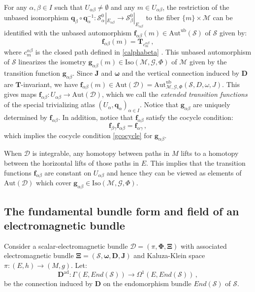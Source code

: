 \documentclass[10pt, cmp, numbook, final, a4paper]{svjour}
\newcommand*{\SavedEqref}{}
\let\SavedEqref\eqref
\renewcommand*{\eqref}[1]{%
  \begingroup
    \hypersetup{
      linkcolor=blue,
      linkbordercolor=blue,
    }%
    \SavedEqref{#1}%
  \endgroup
}
\def\ad{\mathrm{ad}}
\newcommand{\Aut}{\mathrm{Aut}}
\def\bD{\mathbb{D}}
\def\ad{\mathrm{ad}}
\def\bcD{\boldsymbol{\mathcal{D}}}
\def\bJ{\mathbf{J}}
\def\bomega{\boldsymbol{\omega}}
\def\bJ{\mathbf{J}}
\newcommand{\be}{\begin{equation*}}
\newcommand{\ee}{\end{equation*}}
\newcommand{\ben}{\begin{equation}}
\newcommand{\een}{\end{equation}}
\newcommand{\cM}{\mathcal{M}}
\def\cD{\mathcal{D}}
\def\cG{\mathcal{G}}
\def\bXi{{\boldsymbol{\Xi}}}
\def\cS{\mathcal{S}}
\def\mf{\mathbf{f}}
\def\bg{\mathbf{g}}
\def\mT{\mathbf{T}}
\def\bPhi{\mathbf{\Phi}}
\def\bD{\mathbf{D}}
\def\bg{\mathbf{g}}
\def\bomega{\boldsymbol{\omega}}
\def\Iso{\mathrm{Iso}}
\def\ub{\mathrm{ub}}
\def\bcS{\boldsymbol{\mathcal{S}}}
\def\bD{\mathbf{D}}
\def\mq{\mathbf{q}}
\begin{document}
For any $\alpha,\beta\in I$ such that $U_{\alpha\beta}\neq \emptyset$
and any $m\in U_{\alpha\beta}$, the restriction of the unbased
isomorphism $\mq_\beta\circ
\mq^{-1}_\alpha:\bcS^0_{\alpha}|_{E_{\alpha\beta}}\rightarrow
\bcS^0_{\beta}|_{E_{\alpha\beta}}$ to the fiber $\{m\}\times \cM$ can
be identified with the unbased automorphism $\mf_{\alpha\beta}(m)\in
\Aut^\ub(\cS)$ of $\cS$ given by:
\be
\mf_{\alpha\beta}(m)=\mT_{c^{\alpha\beta}_m}\, ,
\ee
where $c^{\alpha\beta}_m$ is the closed path defined in
\eqref{calphabeta}. This unbased automorphism of $\cS$ linearizes the
isometry $\bg_{\alpha\beta}(m)\in \Iso(\cM,\cG,\Phi)$ of $\cM$ given
by the transition function $\bg_{\alpha\beta}$. Since $\bJ$ and
$\bomega$ and the vertical connection induced by $\bD$ are
$\mT$-invariant, we have $\mf_{\alpha\beta}(m)\in
\Aut(\cD)=\Aut^\ub_{\cM,\cG,\Phi}(\cS,D,\omega,J)$. This gives maps
$\mf_{\alpha\beta}:U_{\alpha\beta}\rightarrow \Aut(\cD)$, which we
call the {\em extended transition functions} of the special
trivializing atlas $(U_\alpha,\mq_\alpha)_{\alpha\in I}$. Notice that
$\bg_{\alpha\beta}$ are uniquely determined by $\mf_{\alpha\beta}$. In
addition, notice that $\mf_{\alpha\beta}$ satisfy the cocycle
condition:
\ben
\label{fcocycle}
\mf_{\beta\gamma}\mf_{\alpha\beta}=\mf_{\alpha\gamma}\, ,
\een
which implies the cocycle condition \eqref{gcocycle} for
$\bg_{\alpha\beta}$.
		
When $\bcD$ is integrable, any homotopy between paths in $M$ lifts to
a homotopy between the horizontal lifts of those paths in $E$. This
implies that the transition functions $\mf_{\alpha\beta}$ are constant
on $U_{\alpha\beta}$ and hence they can be viewed as elements of
$\Aut(\cD)$ which cover $\bg_{\alpha\beta}\in \Iso(\cM,\cG,\Phi)$.

\subsection{The fundamental bundle form and field of an electromagnetic bundle}
\label{sec:fundamental}

Consider a scalar-electromagnetic bundle $\bcD = (\pi,\bPhi,\bXi)$
with associated electromagnetic bundle $\bXi = (\bcS,\bomega,\bD,\bJ)$
and Kaluza-Klein space $\pi\colon (E,h)\to (M,g)$. Let:
\begin{equation*}
\bD^{\ad}\colon \Gamma(E,End(\bcS))\to \Omega^{1}(E,End(\bcS))\, ,
\end{equation*}
be the connection induced by $\bD$ on the endomorphism bundle
$End(\bcS)$ of $\bcS$.
\end{document}
